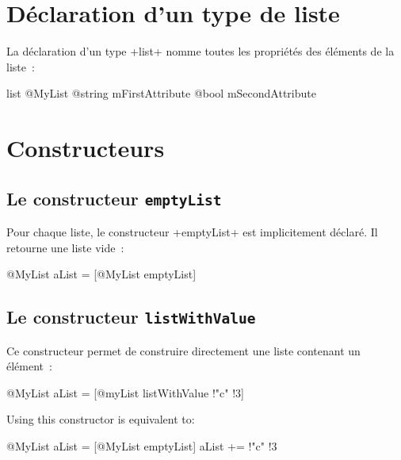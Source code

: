 



\section{Déclaration d'un type de liste}

La déclaration d'un type \ggsq+list+ nomme toutes les propriétés des éléments de la liste~:

\begin{galgas4}
list @MyList {
  @string mFirstAttribute
  @bool mSecondAttribute
}
\end{galgas4}

\section{Constructeurs}

\subsection{Le constructeur \texttt{emptyList}}

Pour chaque liste, le constructeur \ggsq+emptyList+ est implicitement déclaré. Il retourne une liste vide~:

\begin{galgas4}
@MyList aList = [@MyList emptyList]
\end{galgas4}


\subsection{Le constructeur \texttt{listWithValue}}

Ce constructeur permet de construire directement une liste contenant un élément~:

\begin{galgas4}
@MyList aList = [@myList listWithValue !"c" !3]
\end{galgas4}


Using this constructor is equivalent to:

\begin{galgas4}
@MyList aList = [@MyList emptyList]
aList += !"c" !3
\end{galgas4}


